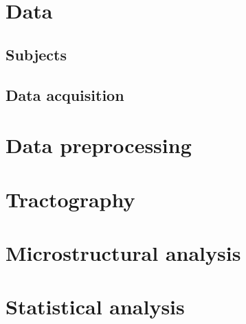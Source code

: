 \section{Data}
 \subsection{Subjects}
 \subsection{Data acquisition}
\section{Data preprocessing}
\section{Tractography}
\section{Microstructural analysis}
\section{Statistical analysis}